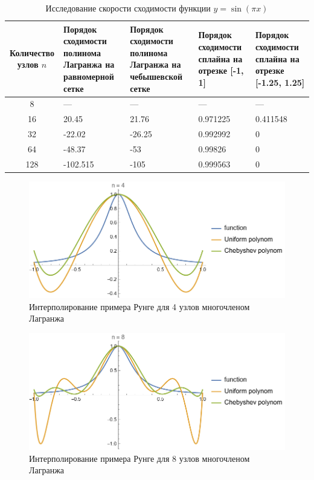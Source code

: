 \documentclass{article}
\begin{document}
    \begin{table}[H]
        \centering
        \caption{Исследование скорости сходимости функции $y = \sin(\pi x)$}
        \begin{tabular}{|c|p{3cm}|p{3cm}|p{3cm}|p{3cm}|}
            \hline
            Количество узлов $n$ & Порядок сходимости полинома Лагранжа на равномерной сетке 
            & Порядок сходимости полинома Лагранжа на чебышевской сетке 
            & Порядок сходимости сплайна на отрезке [-1, 1]
            & Порядок сходимости сплайна на отрезке [-1.25, 1.25] \\
            \hline 
            8 & ---& --- & ---& ---\\
            \hline 
            16 &20.45 & 21.76 & 0.971225& 0.411548\\
            \hline 
            32 & -22.02& -26.25 &0.992992 & 0\\
            \hline 
            64 &-48.37 & -53&0.99826 & 0\\
            \hline 
            128 &-102.515 & -105&0.999563 & 0\\
            \hline
        \end{tabular}
    \end{table}
    \begin{figure}[H]
        \includegraphics[width=\textwidth]{runge4.png}
        \caption{Интерполирование примера Рунге для 4 узлов многочленом Лагранжа}
    \end{figure}
    \begin{figure}[H]
        \includegraphics[width=\textwidth]{runge8.png}
        \caption{Интерполирование примера Рунге для 8 узлов многочленом Лагранжа}
    \end{figure}
\end{document}
